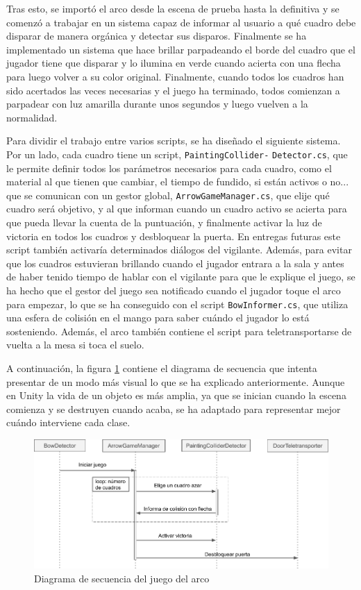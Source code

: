 Tras esto, se importó el arco desde la escena de prueba hasta la definitiva y se comenzó a trabajar en un sistema capaz de informar al usuario a qué cuadro debe disparar de manera orgánica y detectar sus disparos. Finalmente se ha implementado un sistema que hace brillar parpadeando el borde del cuadro que el jugador tiene que disparar y lo ilumina en verde cuando acierta con una flecha para luego volver a su color original. Finalmente, cuando todos los cuadros han sido acertados las veces necesarias y el juego ha terminado, todos comienzan a parpadear con luz amarilla durante unos segundos y luego vuelven a la normalidad.

Para dividir el trabajo entre varios scripts, se ha diseñado el siguiente sistema. Por un lado, cada cuadro tiene un script, \texttt{PaintingCollider-} \texttt{Detector.cs}, que le permite definir todos los parámetros necesarios para cada cuadro, como el material al que tienen que cambiar, el tiempo de fundido, si están activos o no... que se comunican con un gestor global, \texttt{ArrowGameManager.cs}, que elije qué cuadro será objetivo, y al que informan cuando un cuadro activo se acierta para que pueda llevar la cuenta de la puntuación, y finalmente activar la luz de victoria en todos los cuadros y desbloquear la puerta. En entregas futuras este script también activaría determinados diálogos del vigilante. Además, para evitar que los cuadros estuvieran brillando cuando el jugador entrara a la sala y antes de haber tenido tiempo de hablar con el vigilante para que le explique el juego, se ha hecho que el gestor del juego sea notificado cuando el jugador toque el arco para empezar, lo que se ha conseguido con el script \texttt{BowInformer.cs}, que utiliza una esfera de colisión en el mango para saber cuándo el jugador lo está sosteniendo. Además, el arco también contiene el script para teletransportarse de vuelta a la mesa si toca el suelo.

A continuación, la figura \ref{fig:sequence-diagram-bow} contiene el diagrama de secuencia que intenta presentar de un modo más visual lo que se ha explicado anteriormente. Aunque en Unity la vida de un objeto es más amplia, ya que se inician cuando la escena comienza y se destruyen cuando acaba, se ha adaptado para representar mejor cuándo interviene cada clase.

\begin{figure}[!h]
\begin{center}
\includegraphics[width=1\textwidth]{imagenes/7/bow-sequence-diagram.png}
\caption{Diagrama de secuencia del juego del arco}
\label{fig:sequence-diagram-bow}
\end{center}
\end{figure}

